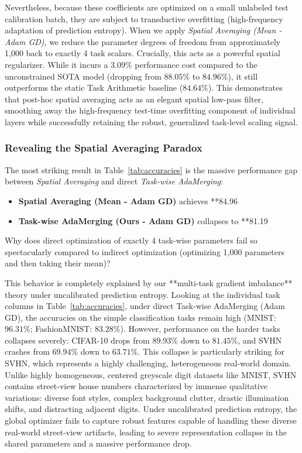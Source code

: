 Nevertheless, because these coefficients are optimized on a small unlabeled test calibration batch, they are subject to transductive overfitting (high-frequency adaptation of prediction entropy). When we apply \emph{Spatial Averaging (Mean - Adam GD)}, we reduce the parameter degrees of freedom from approximately 1,000 back to exactly 4 task scalars. Crucially, this acts as a powerful spatial regularizer. While it incurs a $3.09\%$ performance cost compared to the unconstrained SOTA model (dropping from $88.05\%$ to $84.96\%$), it still outperforms the static Task Arithmetic baseline ($84.64\%$). This demonstrates that post-hoc spatial averaging acts as an elegant spatial low-pass filter, smoothing away the high-frequency test-time overfitting component of individual layers while successfully retaining the robust, generalized task-level scaling signal.

\subsubsection{Revealing the Spatial Averaging Paradox}
\label{sub:spatial_averaging_paradox}
The most striking result in Table~\ref{tab:accuracies} is the massive performance gap between \emph{Spatial Averaging} and direct \emph{Task-wise AdaMerging}:
\begin{itemize}
    \item \textbf{Spatial Averaging (Mean - Adam GD)} achieves **84.96%
    \item \textbf{Task-wise AdaMerging (Ours - Adam GD)} collapses to **81.19%
\end{itemize}
Why does direct optimization of exactly 4 task-wise parameters fail so spectacularly compared to indirect optimization (optimizing 1,000 parameters and then taking their mean)?

This behavior is completely explained by our **multi-task gradient imbalance** theory under uncalibrated prediction entropy. 
Looking at the individual task columns in Table~\ref{tab:accuracies}, under direct Task-wise AdaMerging (Adam GD), the accuracies on the simple classification tasks remain high (MNIST: $96.31\%$; FashionMNIST: $83.28\%$). However, performance on the harder tasks collapses severely: CIFAR-10 drops from $89.93\%$ down to $81.45\%$, and SVHN crashes from $69.94\%$ down to $63.71\%$. This collapse is particularly striking for SVHN, which represents a highly challenging, heterogeneous real-world domain. Unlike highly homogeneous, centered greyscale digit datasets like MNIST, SVHN contains street-view house numbers characterized by immense qualitative variations: diverse font styles, complex background clutter, drastic illumination shifts, and distracting adjacent digits. Under uncalibrated prediction entropy, the global optimizer fails to capture robust features capable of handling these diverse real-world street-view artifacts, leading to severe representation collapse in the shared parameters and a massive performance drop.

